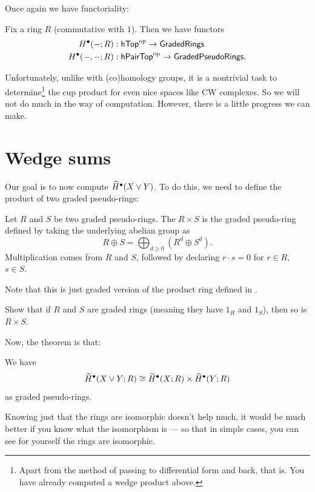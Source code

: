 Once again we have functoriality:
\begin{theorem}
	Fix a ring $R$ (commutative with $1$).
	Then we have functors
	\begin{align*}
		H^\bullet(-; R) &: \mathsf{hTop}^{\mathrm{op}} \to \mathsf{GradedRings} \\
		H^\bullet(-,-; R) &: \mathsf{hPairTop}^{\mathrm{op}} \to \mathsf{GradedPseudoRings}.
	\end{align*}
\end{theorem}

Unfortunately, unlike with (co)homology groups,
it is a nontrivial task to determine\footnote{Apart from the method of passing to differential
form and back, that is. You have already computed a wedge product above.} the cup product
for even nice spaces like CW complexes.
So we will not do much in the way of computation.
However, there is a little progress we can make.

\section{Wedge sums}
Our goal is to now compute $\widetilde H^\bullet(X \vee Y)$.
To do this, we need to define the product of two graded pseudo-rings:
\begin{definition}
	Let $R$ and $S$ be two graded pseudo-rings.
	The  $R \times S$ is the graded pseudo-ring
	defined by taking the underlying abelian group as
	\[ R \oplus S = \bigoplus_{d \ge 0} (R^d \oplus S^d). \]
	Multiplication comes from $R$ and $S$, followed by
	declaring $r \cdot s = 0$ for $r \in R$, $s \in S$.
\end{definition}
Note that this is just graded version of the product ring
defined in .
\begin{exercise}
	Show that if $R$ and $S$ are graded rings (meaning they have $1_R$ and $1_S$),
	then so is $R \times S$.
\end{exercise}

Now, the theorem is that:
\begin{theorem}
	We have
	\[
		\widetilde H^\bullet(X \vee Y; R)
		\cong \widetilde H^\bullet(X;R)
		\times \widetilde H^\bullet(Y;R)
	\]
	as graded pseudo-rings.
\end{theorem}

Knowing just that the rings are isomorphic doesn't help much, it would be much better if you know
what the isomorphism is --- so that in simple cases, you can see for yourself the rings are
isomorphic.

